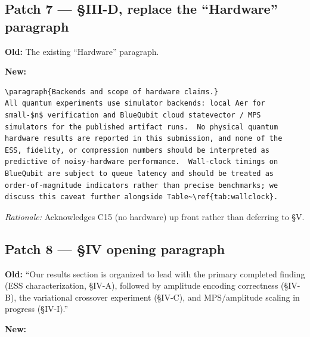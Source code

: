 \subsection*{Patch 7 --- \S III-D, replace the ``Hardware'' paragraph}

\textbf{Old:} The existing ``Hardware'' paragraph.

\noindent\textbf{New:}

\begin{verbatim}
\paragraph{Backends and scope of hardware claims.}
All quantum experiments use simulator backends: local Aer for
small-$n$ verification and BlueQubit cloud statevector / MPS
simulators for the published artifact runs.  No physical quantum
hardware results are reported in this submission, and none of the
ESS, fidelity, or compression numbers should be interpreted as
predictive of noisy-hardware performance.  Wall-clock timings on
BlueQubit are subject to queue latency and should be treated as
order-of-magnitude indicators rather than precise benchmarks; we
discuss this caveat further alongside Table~\ref{tab:wallclock}.
\end{verbatim}

\noindent\emph{Rationale:} Acknowledges C15 (no hardware) up front rather
than deferring to \S V.

\subsection*{Patch 8 --- \S IV opening paragraph}

\textbf{Old:} ``Our results section is organized to lead with the primary
completed finding (ESS characterization, \S IV-A), followed by amplitude
encoding correctness (\S IV-B), the variational crossover experiment
(\S IV-C), and MPS/amplitude scaling in progress (\S IV-I).''

\noindent\textbf{New:}


